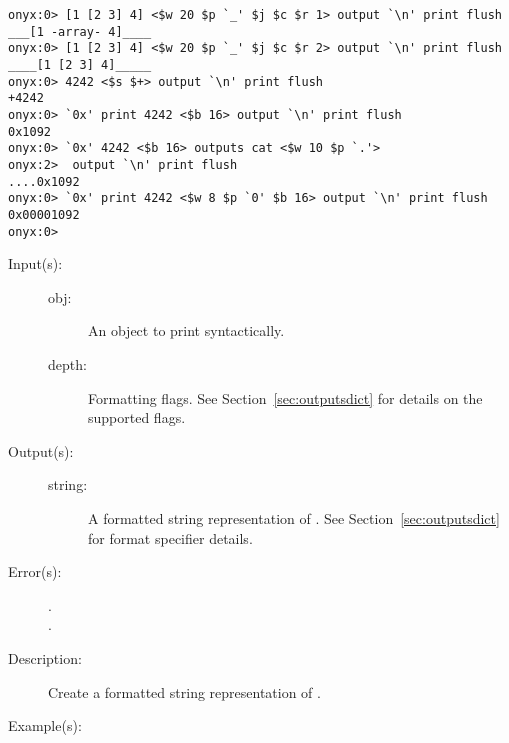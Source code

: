 \begin{description}
\begin{description}
\begin{verbatim}
onyx:0> [1 [2 3] 4] <$w 20 $p `_' $j $c $r 1> output `\n' print flush
___[1 -array- 4]____
onyx:0> [1 [2 3] 4] <$w 20 $p `_' $j $c $r 2> output `\n' print flush
____[1 [2 3] 4]_____
onyx:0> 4242 <$s $+> output `\n' print flush
+4242
onyx:0> `0x' print 4242 <$b 16> output `\n' print flush
0x1092
onyx:0> `0x' 4242 <$b 16> outputs cat <$w 10 $p `.'>
onyx:2>  output `\n' print flush
....0x1092
onyx:0> `0x' print 4242 <$w 8 $p `0' $b 16> output `\n' print flush
0x00001092
onyx:0>
		\end{verbatim}
	\end{description}
\label{systemdict:outputs}
\item[{\onyxop{obj flags}{outputs}{string}}: ]
	\begin{description}\item[]
	\item[Input(s): ]
		\begin{description}\item[]
		\item[obj: ]
			An object to print syntactically.
		\item[depth: ]
			Formatting flags.  See Section~\ref{sec:outputsdict} for
			details on the supported flags.
		\end{description}
	\item[Output(s): ]
		\begin{description}\item[]
		\item[string: ]
			A formatted string representation of .
			See Section~\ref{sec:outputsdict} for format specifier
			details.
		\end{description}
	\item[Error(s): ]
		\begin{description}\item[]
		\item[.]
		\item[.]
		\end{description}
	\item[Description: ]
		Create a formatted string representation of .
	\item[Example(s): ]\begin{verbatim}


\end{verbatim}
\end{description}
\end{description}

